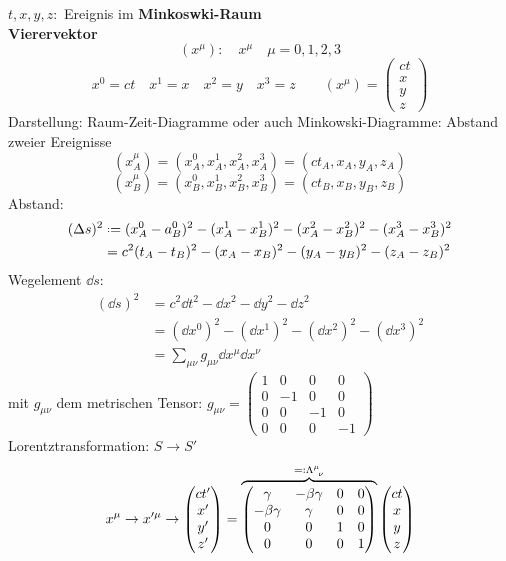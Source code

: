 $ t, x, y, z : $ Ereignis im \textbf{Minkoswki-Raum}\\[5pt]
\textbf{Vierervektor}
\begin{equation*}
\left(x^\mu\right): \quad x^\mu \quad \mu = 0, 1, 2, 3
\end{equation*}
\begin{equation*}
x^0 = ct \quad x^1 = x \quad x^2 = y \quad x^3 = z \qquad (x^\mu) = \begin{pmatrix}
ct \\ x \\ y \\ z
\end{pmatrix}
\end{equation*}
Darstellung: Raum-Zeit-Diagramme oder auch Minkowski-Diagramme:
%
%
%
%
%
%
Abstand zweier Ereignisse
\begin{equation*}
(x_A^\mu) = (x_A^0 , x_A^1, x_A^2, x_A^3) = (ct_A, x_A, y_A, z_A)
\end{equation*}
\begin{equation*}
(x_B^\mu) = (x_B^0 , x_B^1, x_B^2, x_B^3) = (ct_B, x_B, y_B, z_B)
\end{equation*}
Abstand:
\begin{align*}
(\Delta s)^2 &\defeq (x_A^0 - a_B^0)^2 - (x_A^1 - x_B^1)^2 - (x_A^2 - x_B^2)^2 - (x_A^3 - x_B^3)^2\\
&= c^2 (t_A - t_B)^2 - (x_A - x_B)^2 - (y_A - y_B)^2 - (z_A - z_B)^2
\end{align*}
Wegelement $ \dd s $:
\begin{align*}
(\dd s)^2 &= c^2 \dd t^2 - \dd x^2 - \dd y ^2 - \dd z^2\\
&= (\dd x^0)^2 - (\dd x^1)^2 - (\dd x^2)^2 - (\dd x^3)^2\\
&= \sum_{\mu \nu} g_{\mu \nu} \dd x^\mu \dd x^\nu
\end{align*}
mit $ g_{\mu \nu} $ dem metrischen Tensor: $ g_{\mu \nu} = \begin{pmatrix}
1 & 0 & 0 & 0 \\
0 & -1 & 0 & 0 \\
0 & 0 & -1 & 0 \\
0 & 0 & 0 & -1
\end{pmatrix} $
Lorentztransformation: $ S \to S' $
\begin{equation*}
x^\mu \to x'^{\mu} \to \begin{pmatrix}
ct' \\ x' \\ y' \\ z'
\end{pmatrix} = \ob{\begin{pmatrix}
\gamma & - \beta \gamma & 0 & 0 \\
- \beta \gamma & \gamma & 0 & 0 \\
0 & 0 & 1 & 0 \\
0 & 0 & 0 & 1
\end{pmatrix}}^{\eqdef \Lambda^{\mu}_{\ \nu}} \begin{pmatrix}
ct \\ x \\ y \\ z
\end{pmatrix}
\end{equation*}
